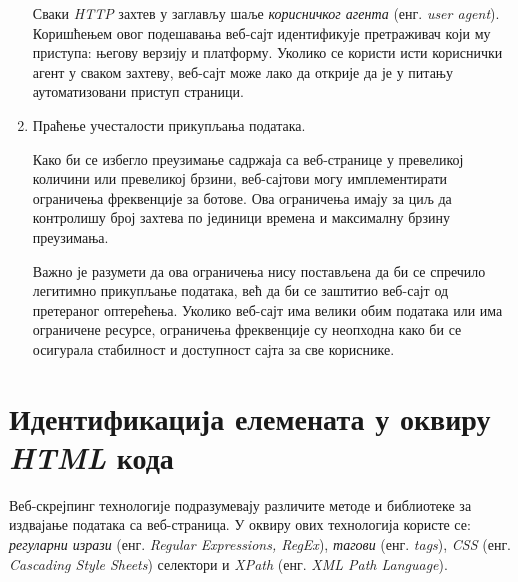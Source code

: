 \documentclass[12pt,oneside]{memoir}
\begin{document}
\begin{enumerate}
    Сваки \textit{HTTP} захтев у заглављу шаље \emph{корисничког агента} (енг. \textit{user agent}). Коришћењем овог подешавања веб-сајт идентификује претраживач који му приступа: његову верзију и платформу. Уколико се користи исти кориснички агент у сваком захтеву, веб-сајт може лако да открије да је у питању аутоматизовани приступ страници.
\item Праћење учесталости прикупљања података.

    Како би се избегло преузимање садржаја са веб-странице у превеликој количини или превеликој брзини, веб-сајтови могу имплементирати ограничења фреквенције за ботове. Ова ограничења имају за циљ да контролишу број захтева по јединици времена и максималну брзину преузимања.
    
    Важно је разумети да ова ограничења нису постављена да би се спречило легитимно прикупљање података, већ да би се заштитио веб-сајт од претераног оптерећења. Уколико веб-сајт има велики обим података или има ограничене ресурсе, ограничења фреквенције су неопходна како би се осигурала стабилност и доступност сајта за све кориснике.
\end{enumerate}

\section{Идентификација елемената у оквиру \textit{HTML} кода}
Веб-скрејпинг технологије подразумевају различите методе и библиотеке за издвајање података са веб-страница. У оквиру ових технологија користе се: \emph{регуларни изрази} (енг. \textit{Regular Expressions, RegEx}), \emph{тагови} (енг. \textit{tags}), \emph{CSS} (енг. \textit{Cascading Style Sheets}) селектори и \emph{XPath} \cite{xpath} (енг. \textit{XML Path Language}).
\end{document}
